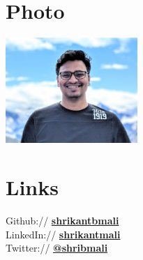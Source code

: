 \documentclass[]{deedy-resume-openfont}
\begin{document}
%
%
\lastupdated

%
%

%
%

\begin{minipage}[t]{0.33\textwidth} 

\section{Photo}
\includegraphics[height=4cm]{photo.jpg} \\

\section{Links} 
Github:// \href{https://github.com/shrikantbmali}{\bf shrikantbmali} \\
LinkedIn://  \href{https://www.linkedin.com/in/shrikantmali/}{\bf shrikantmali} \\
Twitter://  \href{https://twitter.com/shribmali}{\bf @shribmali} \\



\end{minipage}
\end{document}
